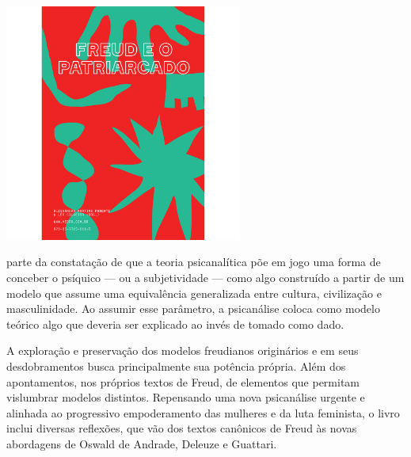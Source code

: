 \pagebreak


\begin{center}
\hspace*{.5cm}\includegraphics[width=78mm]{./grid/freud.png}
\end{center}

\hspace*{-7cm}\hrulefill\hspace*{-7cm}

\medskip

 parte da constatação de que a teoria psicanalítica põe em jogo uma forma de conceber o psíquico --- ou a subjetividade --- como algo construído a partir de um modelo que assume uma equivalência generalizada entre cultura, civilização e masculinidade. Ao assumir esse parâmetro, a psicanálise coloca como modelo teórico algo que deveria ser explicado ao invés de tomado como dado.

A exploração e preservação dos modelos freudianos originários e em seus desdobramentos busca principalmente sua potência própria. Além dos apontamentos, nos próprios textos de Freud, de elementos que permitam vislumbrar modelos distintos. Repensando uma nova psicanálise urgente e alinhada ao progressivo empoderamento das mulheres e da luta feminista, o livro inclui diversas reflexões, que vão dos textos canônicos de Freud às novas abordagens de Oswald de Andrade, Deleuze e Guattari.

\vfill

\hspace*{-.4cm}\begin{minipage}[c]{.5\linewidth}
\small{
{}}
\end{minipage}


